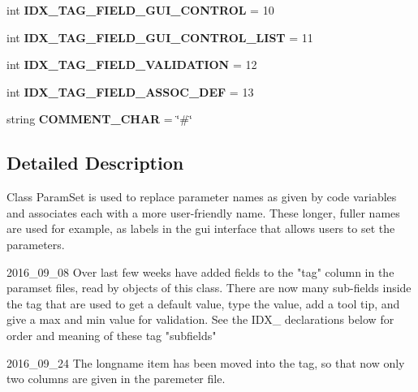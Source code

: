 \begin{DoxyCompactItemize}
\item 
int {\bfseries I\+D\+X\+\_\+\+T\+A\+G\+\_\+\+F\+I\+E\+L\+D\+\_\+\+G\+U\+I\+\_\+\+C\+O\+N\+T\+R\+OL} = 10\hypertarget{classnegui_1_1pgparamset_1_1PGParamSet_a48de36f5304fadf16ea2dc5aa5f9aa10}{}\label{classnegui_1_1pgparamset_1_1PGParamSet_a48de36f5304fadf16ea2dc5aa5f9aa10}

\item 
int {\bfseries I\+D\+X\+\_\+\+T\+A\+G\+\_\+\+F\+I\+E\+L\+D\+\_\+\+G\+U\+I\+\_\+\+C\+O\+N\+T\+R\+O\+L\+\_\+\+L\+I\+ST} = 11\hypertarget{classnegui_1_1pgparamset_1_1PGParamSet_aee6b6d1c25ba78020df4ee6c4db6b4da}{}\label{classnegui_1_1pgparamset_1_1PGParamSet_aee6b6d1c25ba78020df4ee6c4db6b4da}

\item 
int {\bfseries I\+D\+X\+\_\+\+T\+A\+G\+\_\+\+F\+I\+E\+L\+D\+\_\+\+V\+A\+L\+I\+D\+A\+T\+I\+ON} = 12\hypertarget{classnegui_1_1pgparamset_1_1PGParamSet_a859b19d511c2d6b5b912f9fabe172b10}{}\label{classnegui_1_1pgparamset_1_1PGParamSet_a859b19d511c2d6b5b912f9fabe172b10}

\item 
int {\bfseries I\+D\+X\+\_\+\+T\+A\+G\+\_\+\+F\+I\+E\+L\+D\+\_\+\+A\+S\+S\+O\+C\+\_\+\+D\+EF} = 13\hypertarget{classnegui_1_1pgparamset_1_1PGParamSet_a2cb31672fc6311c072bf03d6cb07676e}{}\label{classnegui_1_1pgparamset_1_1PGParamSet_a2cb31672fc6311c072bf03d6cb07676e}

\item 
string {\bfseries C\+O\+M\+M\+E\+N\+T\+\_\+\+C\+H\+AR} = \char`\"{}\#\char`\"{}\hypertarget{classnegui_1_1pgparamset_1_1PGParamSet_a3699c7f57795876fe0a6d4482bfd3295}{}\label{classnegui_1_1pgparamset_1_1PGParamSet_a3699c7f57795876fe0a6d4482bfd3295}

\end{DoxyCompactItemize}


\subsection{Detailed Description}
\begin{DoxyVerb}Class ParamSet is used to replace
parameter names as given by code variables
and associates each with a more user-friendly
name.  These longer, fuller names are used
for example, as labels in the gui interface
that allows users to set the parameters.

2016_09_08
Over last few weeks have added fields to the "tag"
column in the paramset files, read by objects of
this class.  There are now many sub-fields inside
the tag that are used to get a default value, 
type the value, add a tool tip, and give a max
and min value for validation.  See the IDX_ declarations
below for order and meaning of these tag "subfields"

2016_09_24
The longname item has been moved into the tag, so that now
only two columns are given in the paremeter file.\end{DoxyVerb}
 

